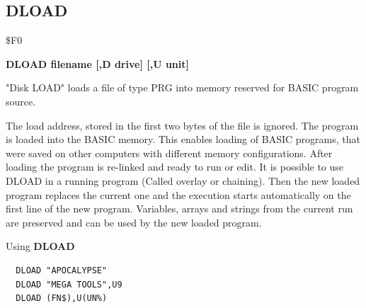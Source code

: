 \subsection{DLOAD}
\begin{description}[leftmargin=2cm,style=nextline]
\item [Token:] \$F0
\item [Format:] {\bf DLOAD filename [,D drive] [,U unit] }
\item [Usage:]
   "Disk LOAD" loads a file of type
   PRG into memory reserved for BASIC program source.

   \filenamedefinition

   \drivedefinition

   \unitdefinition

\item [Remarks:]
   The load address, stored in the first two bytes
   of the file is ignored. The program is loaded into
   the BASIC memory. This enables loading of BASIC programs,
   that were saved on other computers with different memory
   configurations. After loading the program is re-linked
   and ready to run or edit.
   It is possible to use DLOAD in a running program
   (Called overlay or chaining).
   Then the new loaded program replaces the current one
   and the execution starts automatically on the first line of the
   new program. Variables, arrays and strings from the current
   run are preserved and can be used by the new loaded program.

\item [Example:] Using {\bf DLOAD}
\begin{tcolorbox}[colback=black,coltext=white]
\verbatimfont{\codefont}
\begin{verbatim}
  DLOAD "APOCALYPSE"
  DLOAD "MEGA TOOLS",U9
  DLOAD (FN$),U(UN%)
\end{verbatim}
\end{tcolorbox}
\end{description}


\newpage
